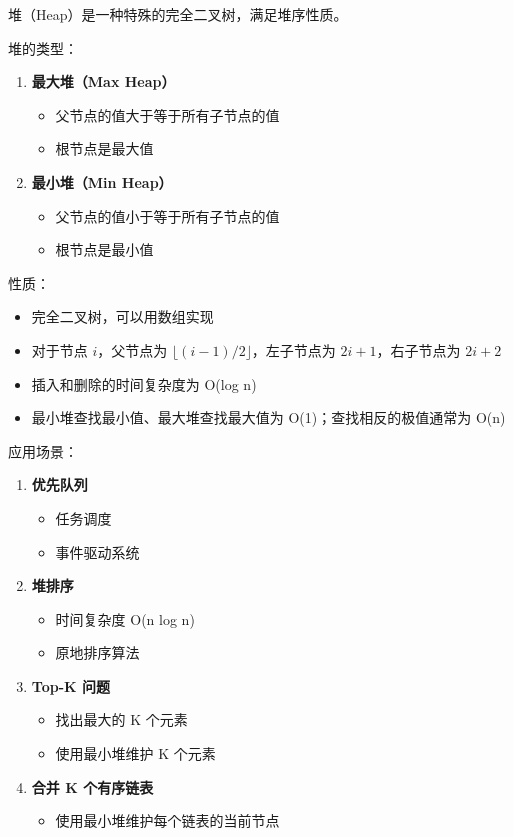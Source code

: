 
堆（Heap）是一种特殊的完全二叉树，满足堆序性质。

堆的类型：
\begin{enumerate}
  \item \textbf{最大堆（Max Heap）}
    \begin{itemize}
      \item 父节点的值大于等于所有子节点的值
      \item 根节点是最大值
    \end{itemize}

  \item \textbf{最小堆（Min Heap）}
    \begin{itemize}
      \item 父节点的值小于等于所有子节点的值
      \item 根节点是最小值
    \end{itemize}
\end{enumerate}

性质：
\begin{itemize}
  \item 完全二叉树，可以用数组实现
  \item 对于节点 $i$，父节点为 $\lfloor (i-1)/2 \rfloor$，左子节点为 $2i+1$，右子节点为 $2i+2$
  \item 插入和删除的时间复杂度为 O(log n)
  \item 最小堆查找最小值、最大堆查找最大值为 O(1)；查找相反的极值通常为 O(n)
\end{itemize}

应用场景：
\begin{enumerate}
  \item \textbf{优先队列}
    \begin{itemize}
      \item 任务调度
      \item 事件驱动系统
    \end{itemize}

  \item \textbf{堆排序}
    \begin{itemize}
      \item 时间复杂度 O(n log n)
      \item 原地排序算法
    \end{itemize}

  \item \textbf{Top-K 问题}
    \begin{itemize}
      \item 找出最大的 K 个元素
      \item 使用最小堆维护 K 个元素
    \end{itemize}

  \item \textbf{合并 K 个有序链表}
    \begin{itemize}
      \item 使用最小堆维护每个链表的当前节点
    \end{itemize}
\end{enumerate}

